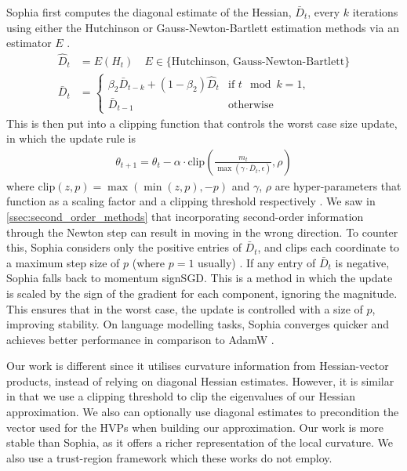 Sophia first computes the diagonal estimate of the Hessian, $\bar{D}_t$, every $k$ iterations using either the Hutchinson or Gauss-Newton-Bartlett estimation methods via an estimator $E$ \citep{liu2023sophia}. 
\begin{align}
    \hat{D}_t &= E(H_t) \quad E \in \{\text{Hutchinson, Gauss-Newton-Bartlett} \} \\
    \bar{D}_t &= 
    \begin{cases}
        \beta_2 \bar{D}_{t-k} + (1 - \beta_2) \hat{D}_t & \text{if } t \mod k = 1, \\
        \bar{D}_{t-1} & \text{otherwise}
    \end{cases}
\end{align}
This is then put into a clipping function that controls the worst case size update, in which the update rule is
\begin{align}
    \theta_{t+1} = \theta_t - \alpha \cdot \text{clip}(\frac{m_t}{\max(\gamma \cdot \bar{D}_t, \epsilon)}, \rho)
\end{align}
where $\text{clip}(z, p) = \max(\min(z, p), -p)$ and $\gamma$, $\rho$ are hyper-parameters that function as a scaling factor and a clipping threshold respectively \citep{liu2023sophia}. We saw in \cref{ssec:second_order_methods} that incorporating second-order information through the Newton step can result in moving in the wrong direction. To counter this, Sophia considers only the positive entries of $\bar{D}_t$, and clips each coordinate to a maximum step size of $p$ (where $p = 1$ usually) \citep{liu2023sophia}. If any entry of $\bar{D}_t$ is negative, Sophia falls back to momentum signSGD. This is a method in which the update is scaled by the sign of the gradient for each component, ignoring the magnitude. This ensures that in the worst case, the update is controlled with a size of $p$, improving stability. On language modelling tasks, Sophia converges quicker and achieves better performance in comparison to AdamW \cite{liu2023sophia}.

Our work is different since it utilises curvature information from Hessian-vector products, instead of relying on diagonal Hessian estimates. However, it is similar in that we use a clipping threshold to clip the eigenvalues of our Hessian approximation. We also can optionally use diagonal estimates to precondition the vector used for the HVPs when building our approximation. Our work is more stable than Sophia, as it offers a richer representation of the local curvature. We also use a trust-region framework which these works do not employ. 

